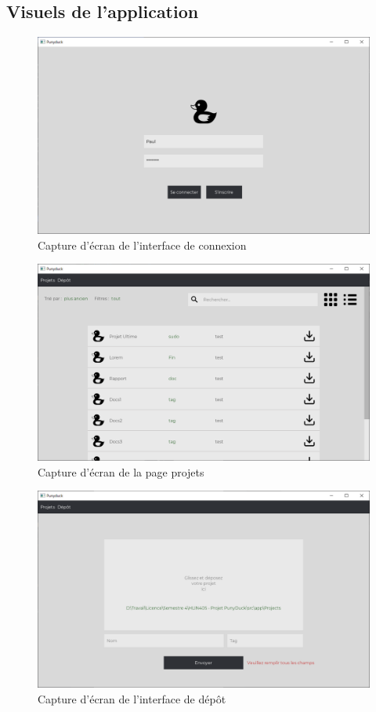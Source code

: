 \documentclass[twoside]{report}
\begin{document}
\begin{appendix}
\chapter{Visuels de l'application}
\label{visuels}
\begin{figure}[!h]
    \centering 
    \includegraphics[scale=0.2]{punyduck-img-1.png}
    \caption{Capture d'écran de l'interface de connexion}
    \label{Connexion}
\end{figure}
\begin{figure}
    \centering
    \includegraphics[scale=0.2]{punyduck-img-2.png}
    \caption{Capture d'écran de la page projets}
    \label{Projets}
\end{figure}
\begin{figure}
    \centering
    \includegraphics[scale=0.2]{punyduck-img-4.png}
    \caption{Capture d'écran de l'interface de dépôt}
    \label{Depot}
\end{figure}


\end{appendix}
\end{document}
